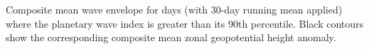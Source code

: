 \label{fig:envelope_climatology}
Composite mean wave envelope for days (with 30-day running mean applied) where the planetary wave index is greater than its 90th percentile. Black contours show the corresponding composite mean zonal geopotential height anomaly.  